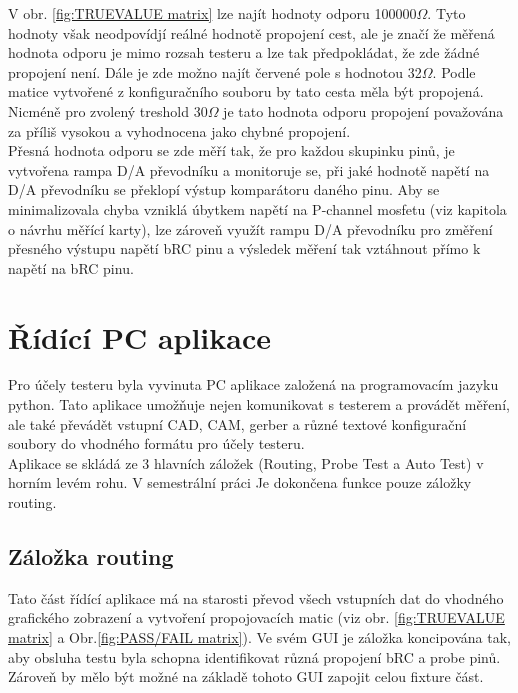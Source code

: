V obr. \ref{fig:TRUEVALUE matrix} lze najít hodnoty odporu 100000$\Omega$. Tyto hodnoty však neodpovídjí reálné hodnotě propojení
cest, ale je značí že měřená hodnota odporu je mimo rozsah testeru a lze tak předpokládat, že zde žádné propojení není.
Dále je zde možno najít červené pole s hodnotou 32$\Omega$. Podle matice vytvořené z konfiguračního 
souboru by tato cesta měla být propojená. Nicméně pro zvolený treshold 30$\Omega$ je tato hodnota odporu propojení
považována za příliš vysokou a vyhodnocena jako chybné propojení.\\

Přesná hodnota odporu se zde měří tak, že pro každou skupinku pinů, je vytvořena rampa D/A převodníku a 
monitoruje se, při jaké hodnotě napětí na D/A převodníku se překlopí výstup komparátoru daného pinu. Aby se 
minimalizovala chyba vzniklá úbytkem napětí na P-channel mosfetu (viz kapitola o návrhu měřící karty),
lze zároveň využít rampu D/A převodníku pro změření přesného výstupu napětí bRC pinu a výsledek měření tak vztáhnout
přímo k napětí na bRC pinu.\\

\chapter{Řídící PC aplikace}
Pro účely testeru byla vyvinuta PC aplikace založená na programovacím jazyku python. Tato aplikace umožňuje
nejen komunikovat s testerem a provádět měření, ale také převádět vstupní CAD, CAM, gerber a různé textové konfigurační
soubory do vhodného formátu pro účely testeru.\\

Aplikace se skládá ze 3 hlavních záložek (Routing, Probe Test a Auto Test) v horním levém rohu. V semestrální práci Je
dokončena funkce pouze záložky routing.

\section{Záložka routing}
Tato část řídící aplikace má na starosti převod všech vstupních dat do vhodného grafického zobrazení a vytvoření
propojovacích matic (viz obr. \ref{fig:TRUEVALUE matrix} a Obr.\ref{fig:PASS/FAIL matrix}).
Ve svém GUI je záložka koncipována tak, aby obsluha testu byla schopna identifikovat různá propojení bRC a probe pinů.
Zároveň by mělo být možné na základě tohoto GUI zapojit celou fixture část.\\

